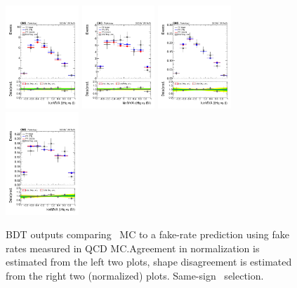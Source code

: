 \begin{figure}[htb]
 \centering
 \includegraphics[width=0.245\textwidth]{figures/FR_closures/thqMVA_tt_2lss_ee_norm.pdf} 
 \includegraphics[width=0.245\textwidth]{figures/FR_closures/thqMVA_ttv_2lss_ee_norm.pdf} 
 \includegraphics[width=0.245\textwidth]{figures/FR_closures/thqMVA_tt_2lss_ee_shape.pdf} 
 \includegraphics[width=0.245\textwidth]{figures/FR_closures/thqMVA_ttv_2lss_ee_shape.pdf}\\ 
\caption{BDT outputs comparing \ttbar\ MC to a fake-rate prediction using fake rates measured in QCD MC.\@ Agreement in normalization is estimated from the left two plots, shape disagreement is estimated from the right two (normalized) plots. Same-sign \ee\ selection.} 
\label{fig:frclosure_2lss_ee}
\end{figure} 


